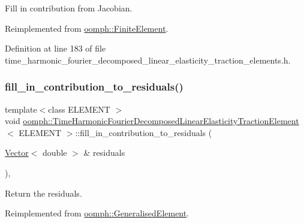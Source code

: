 Fill in contribution from Jacobian. 



Reimplemented from \hyperlink{classoomph_1_1FiniteElement_a0ae7af222af38a0d53bf283dc85bdfea}{oomph\+::\+Finite\+Element}.



Definition at line 183 of file time\+\_\+harmonic\+\_\+fourier\+\_\+decomposed\+\_\+linear\+\_\+elasticity\+\_\+traction\+\_\+elements.\+h.

\mbox{\label{classoomph_1_1TimeHarmonicFourierDecomposedLinearElasticityTractionElement_aef049545e30cf7b9b0409d84606022a7}} 
\subsubsection{\texorpdfstring{fill\+\_\+in\+\_\+contribution\+\_\+to\+\_\+residuals()}{fill\_in\_contribution\_to\_residuals()}}
{\footnotesize\ttfamily template$<$class E\+L\+E\+M\+E\+NT $>$ \\
void \hyperlink{classoomph_1_1TimeHarmonicFourierDecomposedLinearElasticityTractionElement}{oomph\+::\+Time\+Harmonic\+Fourier\+Decomposed\+Linear\+Elasticity\+Traction\+Element}$<$ E\+L\+E\+M\+E\+NT $>$\+::fill\+\_\+in\+\_\+contribution\+\_\+to\+\_\+residuals (\begin{DoxyParamCaption}\item[{\hyperlink{classoomph_1_1Vector}{Vector}$<$ double $>$ \&}]{residuals }\end{DoxyParamCaption})\hspace{0.3cm}{\ttfamily [inline]}, {\ttfamily [virtual]}}



Return the residuals. 



Reimplemented from \hyperlink{classoomph_1_1GeneralisedElement_a310c97f515e8504a48179c0e72c550d7}{oomph\+::\+Generalised\+Element}.



